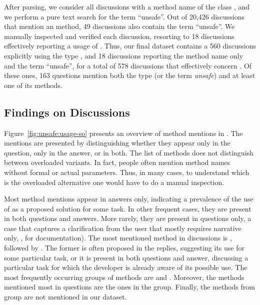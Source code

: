 After parsing, we consider all discussions with a method name of the class \unsafe{},
and we perform a pure text search for the term ``unsafe''.
Out of 20,426 discussions that mention an \unsafe{} method,
49 discussions also contain the term ``unsafe''.
We manually inspected and verified each discussion,
resorting to 18 discussions effectively reporting a usage of \smu{}.
Thus, our final dataset contains a 560 discussions explicitly using the type \unsafe{},
and 18 discussions reporting the method name only and the term ``unsafe'',
for a total of 578 discussions that effectively concern \smu{}.
Of these ones, 163 questions mention both the type (or the term \emph{unsafe}) and at least one of its methods.


\subsection{Findings on \stackoverflow{} Discussions}

Figure~\ref{fig:unsafe:usage-so} presents an overview of \smu{} method mentions in \stackoverflow{}.
The mentions are presented by distinguishing whether they appear only in the question,
only in the answer, or in both.
The list of methods does not distinguish between overloaded variants.
In fact, people often mention method names without formal or actual parameters.
Thus, in many cases, to understand which is the overloaded alternative one would have to do a manual inspection. 

Most method mentions appear in answers only,
indicating a prevalence of the use of \smu{} as a proposed solution for some task.
In other frequent cases, they are present in both questions and answers.
More rarely, they are present in questions only,
a case that captures a clarification from the user that mostly requires narrative only,
\eg{}, for documentation).
The most mentioned method in \stackoverflow{} discussions is ,
followed by .
The former is often proposed in the replies,
suggesting its use for some particular task,
or it is present in both questions and answer,
discussing a particular task for which the developer is already aware of its possible use.
The most frequently occurring groups of methods are  and .
Moreover, the methods mentioned most in questions are the ones in the  group.
Finally, the methods from  group are not mentioned in our dataset.

